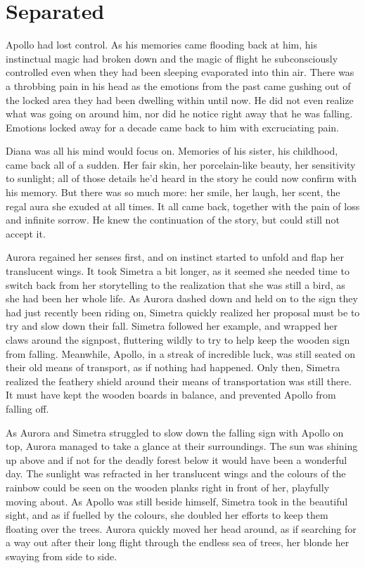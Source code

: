 \chapter{Separated}
\label{cha:separated}
Apollo had lost control. As his memories came flooding back at him, his instinctual magic had broken down and the magic of flight he subconsciously controlled even when they had been sleeping evaporated into thin air. There was a throbbing pain in his head as the emotions from the past came gushing out of the locked area they had been dwelling within until now. He did not even realize what was going on around him, nor did he notice right away that he was falling. Emotions locked away for a decade came back to him with excruciating pain.

Diana was all his mind would focus on. Memories of his sister, his childhood, came back all of a sudden. Her fair skin, her porcelain-like beauty, her sensitivity to sunlight; all of those details he'd heard in the story he could now confirm with his memory. But there was so much more: her smile, her laugh, her scent, the regal aura she exuded at all times. It all came back, together with the pain of loss and infinite sorrow. He knew the continuation of the story, but could still not accept it.

\fancybreaker{}


Aurora regained her senses first, and on instinct started to unfold and flap her translucent wings. It took Simetra a bit longer, as it seemed she needed time to switch back from her storytelling to the realization that she was still a bird, as she had been her whole life. As Aurora dashed down and held on to the sign they had just recently been riding on, Simetra quickly realized her proposal must be to try and slow down their fall. Simetra followed her example, and wrapped her claws around the signpost, fluttering wildly to try to help keep the wooden sign from falling. Meanwhile, Apollo, in a streak of incredible luck, was still seated on their old means of transport, as if nothing had happened. Only then, Simetra realized the feathery shield around their means of transportation was still there. It must have kept the wooden boards in balance, and prevented Apollo from falling off.

As Aurora and Simetra struggled to slow down the falling sign with Apollo on top, Aurora managed to take a glance at their surroundings. The sun was shining up above and if not for the deadly forest below it would have been a wonderful day. The sunlight was refracted in her translucent wings and the colours of the rainbow could be seen on the wooden planks right in front of her, playfully moving about. As Apollo was still beside himself, Simetra took in the beautiful sight, and as if fuelled by the colours, she doubled her efforts to keep them floating over the trees. Aurora quickly moved her head around, as if searching for a way out after their long flight through the endless sea of trees, her blonde her swaying from side to side.


